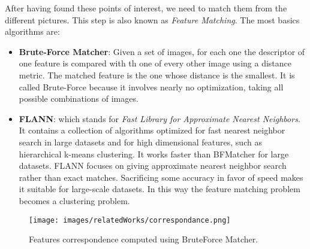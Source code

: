 After having found these points of interest, we need to match them from the different pictures. This step is also known
as \textit{Feature Matching}. The most basics algorithms are:
\begin{itemize}
    \item \textbf{Brute-Force Matcher}: Given a set of images, for each one the descriptor of one feature is compared with th one of every other image using a distance metric.
            The matched feature is the one whose distance is the smallest. It is called Brute-Force because it involves nearly no optimization, taking all possible combinations
            of images.
    \item \textbf{FLANN}: which stands for \textit{Fast Library for Approximate Nearest Neighbors}. It contains a collection of algorithms optimized
     for fast nearest neighbor search in large datasets and for high dimensional features, such as hierarchical k-means clustering. It works faster than BFMatcher for large datasets.
     FLANN focuses on giving approximate nearest neighbor search rather than exact matches. Sacrificing some accuracy in favor of speed makes it suitable for large-scale datasets.
     In this way the feature matching problem becomes a clustering problem.

\end{itemize}

\begin{figure}
    \centering
    \texttt{[image: images/relatedWorks/correspondance.png]} %
    \caption{Features correspondence computed using BruteForce Matcher.}
    \label{fig:politoCorresponance}
\end{figure}


